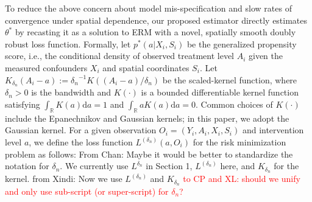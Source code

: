 \documentclass[12pt]{article}
\newcommand{\R}{\mathbb{R}}
\newcommand{\CP}[1]{{\color{purple}From Chan: #1}}
\newcommand{\XL}[1]{{\color{blue}from Xindi: #1}}
\begin{document}

To reduce the above concern about model mis-specification and slow rates of convergence under spatial dependence, our proposed estimator directly estimates $\theta^*$ by recasting it as a solution to ERM with a novel, spatially smooth doubly robust loss function. %
Formally, %
let $p^*(a|X_i,S_i)$ be the generalized propensity score, i.e., the conditional density of observed treatment level $A_i$ given the measured confounders $X_i$ and spatial coordinates $S_i$. 
Let $K_{\delta_n}(A_i-a):={\delta_n}^{-1}K((A_i-a)/{\delta_n})$ be the scaled-kernel function, where ${\delta_n}>0$ is the bandwidth and $K(\cdot)$ is a bounded differentiable kernel function satisfying $\int_\R K(a)\mathrm{d}a = 1$ and $\int_\R a K(a)\mathrm{d}a = 0$. Common choices of $K(\cdot)$ include the Epanechnikov and Gaussian kernels; in this paper, we adopt the Gaussian kernel. 
For a given observation $O_i = (Y_i, A_i, X_i, S_i)$ and intervention level $a$, we define the loss function $L^{({\delta_n})}(a,O_i)$ for the risk minimization problem as follows: 
\CP{Maybe it would be better to standardize the notation for $\delta_n$. We currently use $L^{\delta_n}$ in Section 1, $L^{(\delta_n)}$ here, and $K_{\delta_n}$ for the kernel.} \XL{Now we use $L^{(\delta_n)}$ and $K_{\delta_n}$} \textcolor{red}{to CP and XL: should we unify and only use sub-script (or super-script) for $\delta_n$?}
\end{document}
